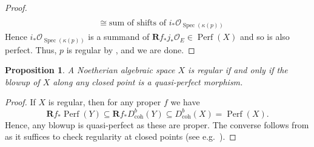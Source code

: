 \documentclass[11pt]{amsart}
\theoremstyle{plain}
\newtheorem{proposition}[theorem]{Proposition}
\theoremstyle{definition}
\numberwithin{equation}{section}
\numberwithin{theorem}{section}
\begin{document}
\begin{appendix}
\begin{proof}
\begin{displaymath}
\begin{aligned}
            \\&\cong \text{sum of shifts of } i_\ast \mathcal{O}_{\operatorname{Spec}(\kappa(p))}
        \end{aligned}
    \end{displaymath}
    Hence $i_\ast\mathcal{O}_{\operatorname{Spec}(\kappa(p))}$ is a summand of $\mathbf{R} f_\ast j_\ast \mathcal{O}_E \in \operatorname{Perf}(X)$ and so is also perfect. Thus, $p$ is regular by , and we are done.
\end{proof}

\begin{proposition}
    \label{prop:regularity_via_blowups}
    A Noetherian algebraic space $X$ is regular if and only if the blowup of $X$ along any closed point is a quasi-perfect morphism.
\end{proposition}

\begin{proof}
    If $X$ is regular, then for any proper $f$ we have
    \begin{displaymath}
        \mathbf{R}f_\ast  \operatorname{Perf}(Y)\subseteq \mathbf{R}f_\ast D^b_{\operatorname{coh}}(Y)\subseteq D^b_{\operatorname{coh}}(X) = \operatorname{Perf}(X).
    \end{displaymath}
    Hence, any blowup is quasi-perfect as these are proper.
    The converse follows from  as it suffices to check regularity at closed points (see e.g.\ \cite[Lemma 3.2]{DeDeyn/Lank/ManaliRahul/Peng:2025}).  
\end{proof}


\end{appendix}
\end{document}
